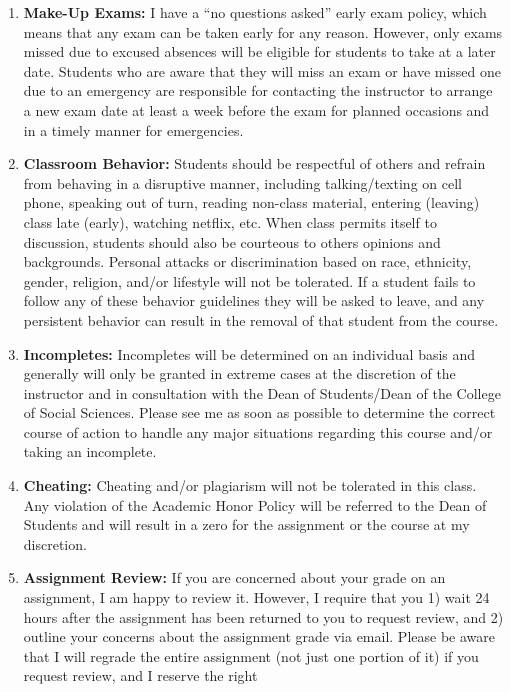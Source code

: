 \documentclass[11pt,]{article}
\providecommand{\tightlist}{%
  \setlength{\itemsep}{0pt}\setlength{\parskip}{0pt}}
\begin{document}
\begin{enumerate}
\def\labelenumi{\arabic{enumi}.}
\tightlist
\item
  \textbf{Make-Up Exams:} I have a ``no questions asked'' early exam
  policy, which means that any exam can be taken early for any reason.
  However, only exams missed due to excused absences will be eligible
  for students to take at a later date. Students who are aware that they
  will miss an exam or have missed one due to an emergency are
  responsible for contacting the instructor to arrange a new exam date
  at least a week before the exam for planned occasions and in a timely
  manner for emergencies.
\item
  \textbf{Classroom Behavior:} Students should be respectful of others
  and refrain from behaving in a disruptive manner, including
  talking/texting on cell phone, speaking out of turn, reading non-class
  material, entering (leaving) class late (early), watching netflix,
  etc. When class permits itself to discussion, students should also be
  courteous to others opinions and backgrounds. Personal attacks or
  discrimination based on race, ethnicity, gender, religion, and/or
  lifestyle will not be tolerated. If a student fails to follow any of
  these behavior guidelines they will be asked to leave, and any
  persistent behavior can result in the removal of that student from the
  course.
\item
  \textbf{Incompletes:} Incompletes will be determined on an individual
  basis and generally will only be granted in extreme cases at the
  discretion of the instructor and in consultation with the Dean of
  Students/Dean of the College of Social Sciences. Please see me as soon
  as possible to determine the correct course of action to handle any
  major situations regarding this course and/or taking an incomplete.
\item
  \textbf{Cheating:} Cheating and/or plagiarism will not be tolerated in
  this class. Any violation of the Academic Honor Policy will be
  referred to the Dean of Students and will result in a zero for the
  assignment or the course at my discretion.
\item
  \textbf{Assignment Review:} If you are concerned about your grade on
  an assignment, I am happy to review it. However, I require that you 1)
  wait 24 hours after the assignment has been returned to you to request
  review, and 2) outline your concerns about the assignment grade via
  email. Please be aware that I will regrade the entire assignment (not
  just one portion of it) if you request review, and I reserve the right

\end{enumerate}
\end{document}

